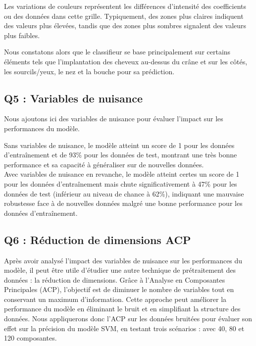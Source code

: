 \documentclass{scrartcl}
\begin{document}
Les variations de couleurs représentent les différences d'intensité des coefficients ou des données dans cette grille. Typiquement, des zones plus claires indiquent des valeurs plus élevées, tandis que des zones plus sombres signalent des valeurs plus faibles.\newline

Nous constatons alors que le classifieur se base principalement sur certains éléments tels que l'implantation des cheveux au-dessus du crâne et sur les côtés, les sourcils/yeux, le nez et la bouche pour sa prédiction.

\subsection{Q5 : Variables de nuisance}
\hspace{7pt} Nous ajoutons ici des variables de nuisance pour évaluer l'impact sur les performances du modèle.\newline

Sans variables de nuisance, le modèle atteint un score de 1 pour les données d'entraînement et de 93\% pour les données de test, montrant une très bonne performance et sa capacité à généraliser sur de nouvelles données.\\
Avec variables de nuisance en revanche, le modèle atteint certes un score de 1 pour les données d'entraînement mais chute significativement à 47\% pour les données de test (inférieur au niveau de chance à 62\%), indiquant une mauvaise robustesse face à de nouvelles données malgré une bonne performance pour les données d'entraînement.

\subsection{Q6 : Réduction de dimensions ACP}
\hspace{7pt} Après avoir analysé l'impact des variables de nuisance sur les performances du modèle, il peut être utile d'étudier une autre technique de prétraitement des données : la réduction de dimensions. Grâce à l'Analyse en Composantes Principales (ACP), l'objectif est de diminuer le nombre de variables tout en conservant un maximum d'information. Cette approche peut améliorer la performance du modèle en éliminant le bruit et en simplifiant la structure des données. Nous appliquerons donc l'ACP sur les données bruitées pour évaluer son effet sur la précision du modèle SVM, en testant trois scénarios : avec 40, 80 et 120 composantes.\newline
\end{document}
